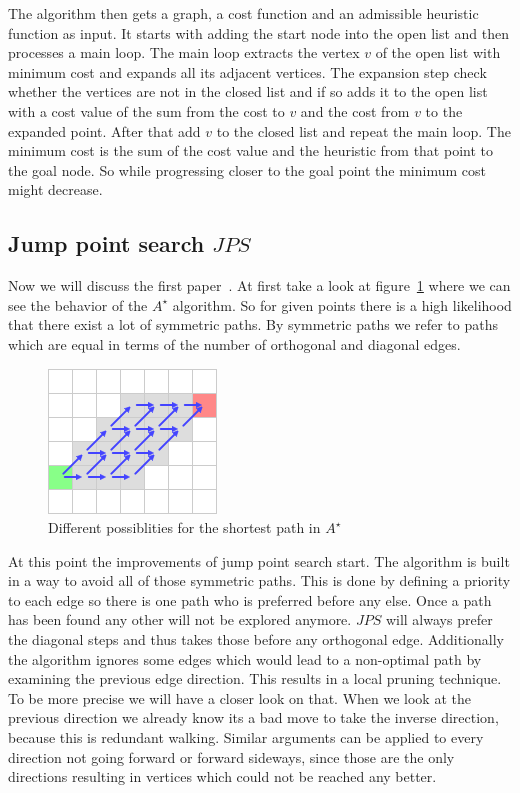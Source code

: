 \documentclass{article}
\begin{document}
    The algorithm then gets a graph, a cost function and an admissible heuristic function as input. It starts with adding the start node into the open list and then processes a main loop. The main loop extracts the vertex $v$ of the open list with minimum cost and expands all its adjacent vertices. The expansion step check whether the vertices are not in the closed list and if so adds it to the open list with a cost value of the sum from the cost to $v$ and the cost from $v$ to the expanded point. After that add $v$ to the closed list and repeat the main loop. The minimum cost is the sum of the cost value and the heuristic from that point to the goal node. So while progressing closer to the goal point the minimum cost might decrease.

    \subsection{Jump point search $JPS$}

    Now we will discuss the first paper~\cite{DBLP:conf/aaai/HaraborG11}. At first take a look at figure~\ref{fig:symmetricpath} where we can see the behavior of the $A^\star$ algorithm. So for given points there is a high likelihood that there exist a lot of symmetric paths. By symmetric paths we refer to paths which are equal in terms of the number of orthogonal and diagonal edges.

    \begin{figure}[!htb]
        \centering
        \includegraphics{figures/symmetricpath.png}
        \caption{Different possiblities for the shortest path in $A^\star$ \cite{JPSexplained}}
        \label{fig:symmetricpath}
    \end{figure}

    At this point the improvements of jump point search start. The algorithm is built in a way to avoid all of those symmetric paths. This is done by defining a priority to each edge so there is one path who is preferred before any else. Once a path has been found any other will not be explored anymore. $JPS$ will always prefer the diagonal steps and thus takes those before any orthogonal edge. Additionally the algorithm ignores some edges which would lead to a non-optimal path by examining the previous edge direction. This results in a local pruning technique. To be more precise we will have a closer look on that. When we look at the previous direction we already know its a bad move to take the inverse direction, because this is redundant walking. Similar arguments can be applied to every direction not going forward or forward sideways, since those are the only directions resulting in vertices which could not be reached any better.
\end{document}
